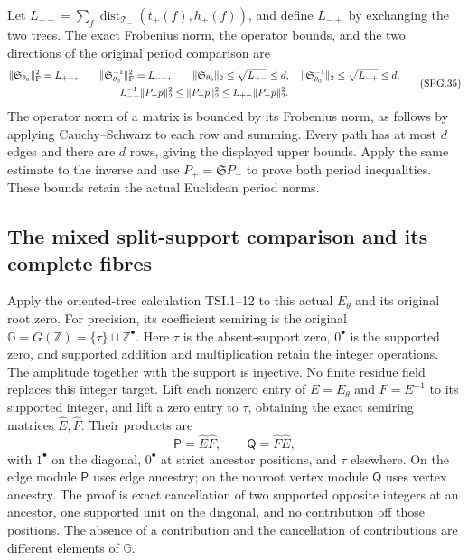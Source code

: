 Let
\(L_{+-}=\sum_f\operatorname{dist}_{\mathcal T_-}
(t_+(f),h_+(f))\), and define \(L_{-+}\) by exchanging the two
trees. The exact Frobenius norm, the operator bounds, and the two
directions of the original period comparison are
\[
 \begin{gathered}
 \|\mathfrak S_{\theta_0}\|_{\rm F}^2=L_{+-},\qquad
 \|\mathfrak S_{\theta_0}^{-1}\|_{\rm F}^2=L_{-+},\qquad
 \|\mathfrak S_{\theta_0}\|_2\le\sqrt{L_{+-}}\le d,
 \quad \|\mathfrak S_{\theta_0}^{-1}\|_2\le\sqrt{L_{-+}}\le d,\\
 L_{-+}^{-1}\|P_-p\|_2^2
     \le\|P_+p\|_2^2\le L_{+-}\|P_-p\|_2^2.
 \end{gathered}
 \tag{SPG.35}\label{eq:spg-path-norms}
\]
The operator norm of a matrix is bounded by its Frobenius norm,
as follows by applying Cauchy--Schwarz to each row and summing.
Every path has at most \(d\) edges and there are \(d\) rows,
giving the displayed upper bounds. Apply the same estimate to the
inverse and use \(P_+=\mathfrak S P_-\) to prove both period
inequalities. These bounds retain the actual Euclidean period norms.

\subsection{The mixed split-support comparison and its complete fibres}

Apply the oriented-tree calculation TSI.1--12 to this actual
\(E_\theta\) and its original root zero. For precision, its
coefficient semiring is the original
\(\mathbb G=G(\mathbb Z)=\{\tau\}\sqcup\mathbb Z^\bullet\).
Here \(\tau\) is the absent-support zero, \(0^\bullet\) is the
supported zero, and supported addition and multiplication retain
the integer operations. The amplitude together with the support
is injective. No finite residue field replaces this integer target.
Lift each nonzero entry of \(E=E_\theta\) and \(F=E^{-1}\)
to its supported integer, and lift a zero entry to \(\tau\),
obtaining the exact semiring matrices \(\widehat E,\widehat F\).
Their products are
\[
 \mathsf P=\widehat E\widehat F,\qquad
 \mathsf Q=\widehat F\widehat E,
 \tag{SPG.36}\label{eq:spg-split-products}
\]
with \(1^\bullet\) on the diagonal, \(0^\bullet\) at strict
ancestor positions, and \(\tau\) elsewhere. On the edge module
\(\mathsf P\) uses edge ancestry; on the nonroot vertex module
\(\mathsf Q\) uses vertex ancestry. The proof is exact cancellation
of two supported opposite integers at an ancestor, one supported
unit on the diagonal, and no contribution off those positions.
The absence of a contribution and the cancellation of contributions
are different elements of \(\mathbb G\).

